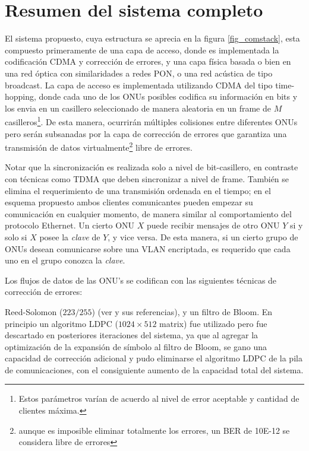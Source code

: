 \section{Resumen del sistema completo}
El sistema propuesto, cuya estructura se aprecia en la figura \ref{fig_comstack}, esta compuesto primeramente de una capa de acceso, donde es implementada la codificación CDMA y corrección de errores, y una capa física basada o bien en una red óptica con similaridades a redes PON, o una red acústica de tipo broadcast.
La capa de acceso es implementada utilizando CDMA del tipo time-hopping, donde cada uno de los ONUs posibles codifica su información en bits y los envia en un casillero seleccionado de manera aleatoria en un frame de $M$ casilleros\footnote{ Estos parámetros varían de acuerdo al nivel de error aceptable y cantidad de clientes máxima.}. De esta manera, ocurrirán múltiples colisiones entre diferentes ONUs pero serán subsanadas por la capa de corrección de errores que garantiza una transmisión de datos virtualmente\footnote{aunque es imposible eliminar totalmente los errores, un BER de 10E-12 se considera libre de errores} libre de errores.

Notar que la sincronización es realizada solo a nivel de bit-casillero, en contraste con técnicas como TDMA que deben sincronizar a nivel de frame. También se elimina el requerimiento de una transmisión ordenada en el tiempo; en el esquema propuesto ambos clientes comunicantes pueden empezar su comunicación en cualquier momento, de manera similar al comportamiento del protocolo Ethernet.
Un cierto ONU $X$ puede recibir mensajes de otro ONU $Y$ si y solo si $X$ posee la {\em clave} de $Y$, y vice versa. De esta manera, si un cierto grupo de ONUs desean comunicarse sobre una VLAN encriptada, es requerido que cada uno en el grupo conozca la {\em clave}.

Los flujos de datos de las ONU's se codifican con las siguientes técnicas de corrección de errores:

Reed-Solomon ($223/255$) (ver \cite{Moon:05} y sus referencias), y un filtro de Bloom\cite{Bloom70space/timetrade-offs}. En principio un algoritmo LDPC ($1024\times512$ matrix) fue utilizado pero fue descartado en posteriores iteraciones del sistema, ya que al agregar la optimización de la expansión de símbolo al filtro de Bloom, se gano una capacidad de corrección adicional y pudo eliminarse el algoritmo LDPC de la pila de comunicaciones, con el consiguiente aumento de la capacidad total del sistema.

